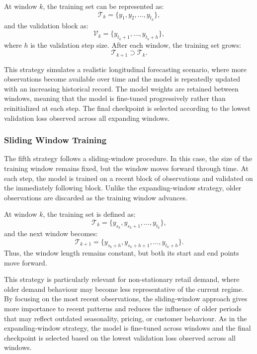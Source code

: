 At window \(k\), the training set can be represented as:
\[
    \mathcal{T}_k = \{y_1, y_2, \ldots, y_{t_k}\},
\]
and the validation block as:
\[
    \mathcal{V}_k = \{y_{t_k+1}, \ldots, y_{t_k+h}\},
\]
where \(h\) is the validation step size. After each window, the training set grows:
\[
    \mathcal{T}_{k+1} \supset \mathcal{T}_k.
\]

This strategy simulates a realistic longitudinal forecasting scenario, where more observations become available over time and the model is repeatedly updated with an increasing historical record. The model weights are retained between windows, meaning that the model is fine-tuned progressively rather than reinitialized at each step. The final checkpoint is selected according to the lowest validation loss observed across all expanding windows.



\subsubsection{Sliding Window Training}

The fifth strategy follows a sliding-window procedure. In this case, the size of the training window remains fixed, but the window moves forward through time. At each step, the model is trained on a recent block of observations and validated on the immediately following block. Unlike the expanding-window strategy, older observations are discarded as the training window advances.

At window \(k\), the training set is defined as:
\[
    \mathcal{T}_k = \{y_{s_k}, y_{s_k+1}, \ldots, y_{t_k}\},
\]
and the next window becomes:
\[
    \mathcal{T}_{k+1} = \{y_{s_k+h}, y_{s_k+h+1}, \ldots, y_{t_k+h}\}.
\]
Thus, the window length remains constant, but both its start and end points move forward.



This strategy is particularly relevant for non-stationary retail demand, where older demand behaviour may become less representative of the current regime. By focusing on the most recent observations, the sliding-window approach gives more importance to recent patterns and reduces the influence of older periods that may reflect outdated seasonality, pricing, or customer behaviour. As in the expanding-window strategy, the model is fine-tuned across windows and the final checkpoint is selected based on the lowest validation loss observed across all windows.

